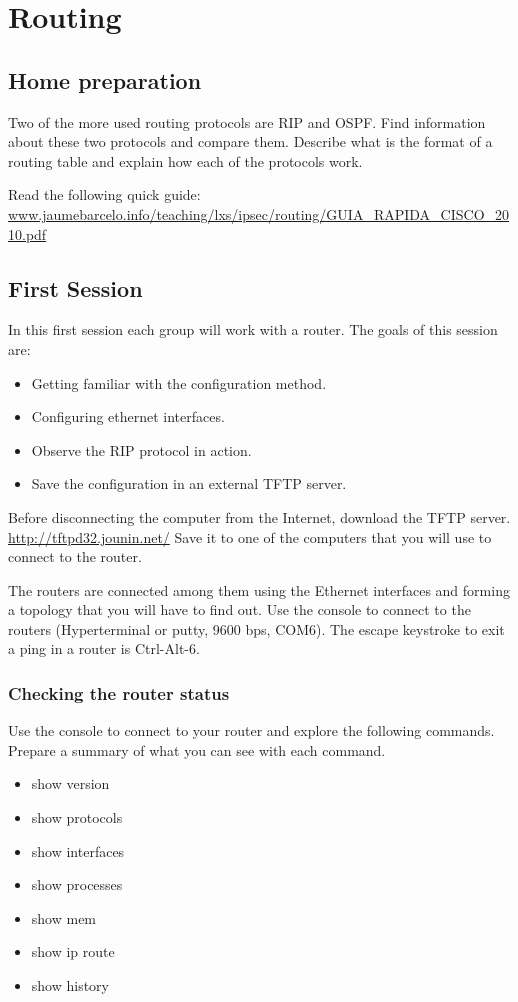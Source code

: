 \chapter{Routing}

\section{Home preparation}
Two of the more used routing protocols are RIP and OSPF.
Find information about these two protocols and compare them.
Describe what is the format of a routing table and explain how each of the protocols work.

Read the following quick guide:
\url{www.jaumebarcelo.info/teaching/lxs/ipsec/routing/GUIA_RAPIDA_CISCO_2010.pdf}

\section{First Session}

In this first session each group will work with a router. 
The goals of this session are:
\begin{itemize}
\item Getting familiar with the configuration method.
\item Configuring ethernet interfaces.
\item Observe the RIP protocol in action.
\item Save the configuration in an external TFTP server.
\end{itemize}

Before disconnecting the computer from the Internet, download the TFTP server.
\url{http://tftpd32.jounin.net/}
Save it to one of the computers that you will use to connect to the router.

The routers are connected among them using the Ethernet interfaces and forming a topology that you will have to find out.
Use the console to connect to the routers (Hyperterminal or putty, 9600 bps, COM6).
The escape keystroke to exit a ping in a router is Ctrl-Alt-6.

\subsection{Checking the router status}

Use the console to connect to your router and explore the following commands.
Prepare a summary of what you can see with each command.
\begin{itemize}
\item show version
\item show protocols
\item show interfaces
\item show processes
\item show mem
\item show ip route
\item show history
\end{itemize}

